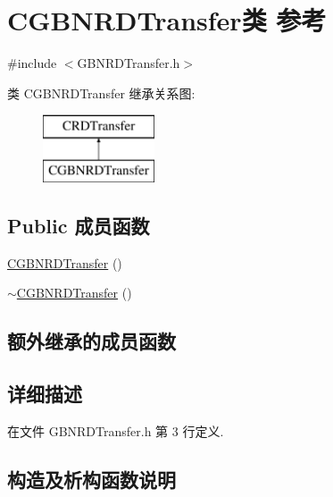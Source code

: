 \hypertarget{class_c_g_b_n_r_d_transfer}{}\section{C\+G\+B\+N\+R\+D\+Transfer类 参考}
\label{class_c_g_b_n_r_d_transfer}


{\ttfamily \#include $<$G\+B\+N\+R\+D\+Transfer.\+h$>$}

类 C\+G\+B\+N\+R\+D\+Transfer 继承关系图\+:\begin{figure}[H]
\begin{center}
\leavevmode
\includegraphics[height=2.000000cm]{class_c_g_b_n_r_d_transfer}
\end{center}
\end{figure}
\subsection*{Public 成员函数}
\begin{DoxyCompactItemize}
\item 
\hyperlink{class_c_g_b_n_r_d_transfer_a30a068efae62da055019080cf705067b}{C\+G\+B\+N\+R\+D\+Transfer} ()
\item 
\hyperlink{class_c_g_b_n_r_d_transfer_a4de477d40f503ddea1b4151933264fec}{$\sim$\+C\+G\+B\+N\+R\+D\+Transfer} ()
\end{DoxyCompactItemize}
\subsection*{额外继承的成员函数}


\subsection{详细描述}


在文件 G\+B\+N\+R\+D\+Transfer.\+h 第 3 行定义.



\subsection{构造及析构函数说明}
\mbox{\label{class_c_g_b_n_r_d_transfer_a30a068efae62da055019080cf705067b}} 
